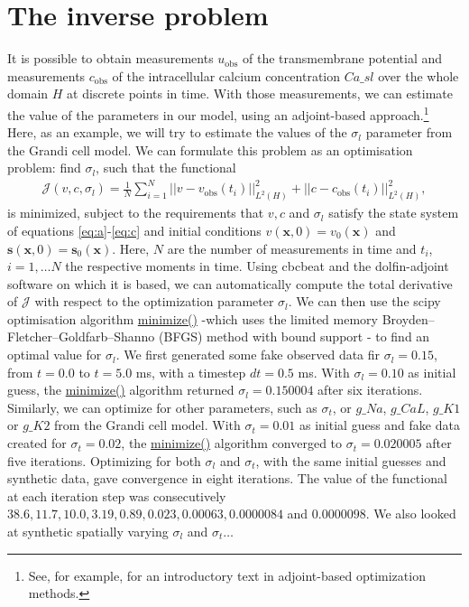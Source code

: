 \documentclass[12pt,a4paper]{article}
\begin{document}
\section{The inverse problem} \label{The inverse problem}
It is possible to obtain measurements $u_{\text{obs}}$ of the transmembrane potential and measurements $c_{\text{obs}}$ of the intracellular calcium concentration $Ca\_sl$ over the whole domain $H$ at discrete points in time. With those measurements, we can estimate the value of the parameters in our model, using an adjoint-based approach.\footnote{See, for example, \cite{Gunzburger} for an introductory text in adjoint-based optimization methods.} Here, as an example, we will try to estimate the values of the $\sigma_l$ parameter from the Grandi cell model.
We can formulate this problem as an optimisation problem: find $\sigma_l$, such that the functional
\begin{eqnarray}
\mathcal{J}(v, c, \sigma_l)= \frac{1}{N} \sum_{i=1}^{N} ||v-v_{\text{obs}}(t_i)||^2_{L^2(H)} + ||c-c_{\text{obs}}(t_i) ||^2_{L^2(H)},\label{J}
\end{eqnarray}
is minimized, subject to the requirements that $v, c$ and $\sigma_l$ satisfy the state system of equations \eqref{eq:a}-\eqref{eq:c} and initial conditions $v(\textbf{x},0)=v_0(\textbf{x})$ and $\mathbf{s}(\mathbf{x},0)=\mathbf{s}_0(\mathbf{x})$. Here, $N$ are the number of measurements in time and $t_i$, $i=1, \dots N$ the respective moments in time.
Using cbcbeat and the dolfin-adjoint software on which it is based, we can automatically compute the total derivative of $\mathcal{J}$ with respect to the optimization parameter $\sigma_l$. We can then use the scipy optimisation algorithm \url{minimize()} -which uses the limited memory Broyden–Fletcher–Goldfarb–Shanno (BFGS) method with bound support - to find an optimal value for $\sigma_l$. We first generated some fake observed data fir $\sigma_l=0.15$, from $t=0.0$ to $t=5.0$ ms, with a timestep $dt=0.5$ ms. With $\sigma_l=0.10$ as initial guess, the \url{minimize()} algorithm returned $\sigma_l=0.150004$ after six iterations. Similarly, we can optimize for other parameters, such as $\sigma_t$, or $g\_Na$, $g\_CaL$, $g\_K1$ or $g\_K2$ from the Grandi cell model. With $\sigma_t=0.01$ as initial guess and fake data created for $\sigma_t=0.02$, the \url{minimize()} algorithm converged to $\sigma_t=0.020005$ after five iterations. Optimizing for both $\sigma_l$ and $\sigma_t$, with the same initial guesses and synthetic data, gave convergence in eight iterations. The value of the functional at each iteration step was consecutively $38.6, 11.7, 10.0, 3.19, 0.89, 0.023, 0.00063, 0.0000084$ and $0.0000098$. We also looked at synthetic spatially varying $\sigma_l$ and $\sigma_t$$\ldots$
\end{document}
